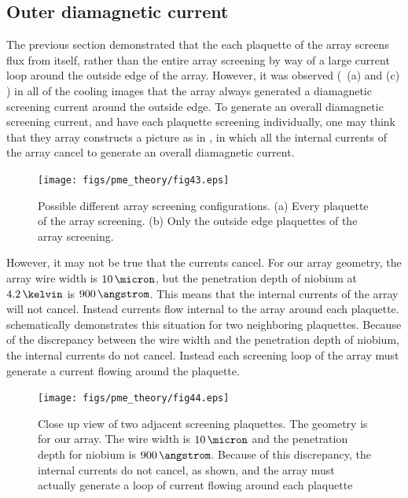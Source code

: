 \subsection{Outer diamagnetic current}

The previous section demonstrated that the each plaquette of the array
screens flux from itself, rather than the entire array 
screening by way of a large current loop around the outside edge
of the array. 
However, it was observed 
(\cf\ (a) and (c) ) in all of the 
cooling images that the array always generated a diamagnetic 
screening current around the outside edge. To
generate an overall diamagnetic screening current,
and have each plaquette screening individually, one may think
that they array constructs a picture as in 
, in which all the 
internal currents of the array cancel to generate an overall
diamagnetic current. 

\begin{figure}
\texttt{[image: figs/pme\_theory/fig43.eps]}
\caption[Different array screening configurations for individual
plaquettes]
{Possible different array screening configurations. (a) Every
plaquette of the array screening. (b) Only the outside edge plaquettes
of the array screening. }
\label{fig:plaquette_screening}
\end{figure}

However, it may not be true that the currents cancel. For our array
geometry, the array wire width is $10\,\micron$, but the penetration
depth of niobium at $4.2\,\kelvin$ is $900\,\angstrom$. This means that
the internal currents of the array will not cancel. Instead currents
flow internal to the array around each plaquette. 
 schematically demonstrates
this situation for two neighboring plaquettes. 
Because of the discrepancy between the wire width
and the penetration depth of niobium, the internal currents do not
cancel. Instead each screening loop of the array must generate 
a current flowing around the plaquette. 

\begin{figure}
\texttt{[image: figs/pme\_theory/fig44.eps]}
\caption[Close up view to two adjacent screening plaquettes]
{Close up view of two adjacent screening plaquettes. The geometry
is for our array. The wire width is $10\,\micron$ and the penetration
depth for niobium is $900\,\angstrom$. Because of this discrepancy,
the internal currents do not cancel, as shown, and the array
must actually generate a loop of current flowing around each
plaquette}
\label{fig:plaquette_screening_close_up}
\end{figure}

